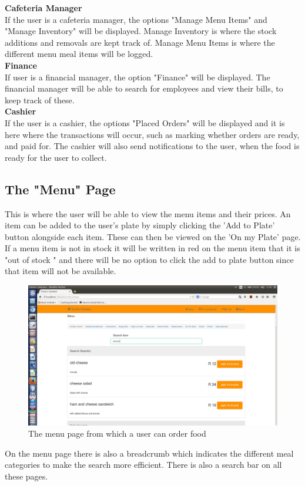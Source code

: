 \documentclass[a4paper,12pt]{report}
\begin{document}
\textbf{Cafeteria Manager}\\
If the user is a cafeteria manager, the options "Manage Menu Items" and "Manage Inventory" will be displayed. Manage Inventory is where the stock additions and removals are kept track of. Manage Menu Items  is where the different menu meal items will be logged.\\

\textbf{Finance}\\
If user is a financial manager, the option "Finance" will be displayed. The financial manager will be able to search for employees and view their bills, to keep track of these.\\

\textbf{Cashier}\\
If the user is a cashier, the options "Placed Orders" will be displayed and it is here where the transactions will occur, such as marking whether orders are ready, and paid for. The cashier will also send notifications to the user, when the food is ready for the user to collect. 

\subsection{The "Menu" Page} 
This is where the user will be able to view the menu items and their prices. An item can be added to the user's plate by simply clicking the 'Add to Plate' button alongside each item. These can then be viewed on the 'On my Plate' page.
If a menu item is not in stock it will be written in red on the menu item that it is "out of stock " and there will be no  option to click the add to plate button since that item will not be available. 
\\
\begin{figure}[H]
  \centering
    \includegraphics[width=1.0\textwidth]{screenshots/searchCheese.png}
    \caption{The menu page from which a user can order food} 
\end{figure}
On the menu page there is also a breadcrumb which indicates the different meal categories to make the search more efficient. There is also a search bar on all these pages. 
\end{document}
